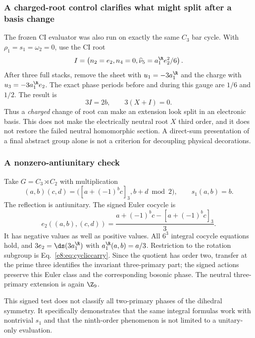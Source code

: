 \subsubsection{A charged-root control clarifies what might split after a basis change}
The frozen CI evaluator was also run on exactly the same $C_3$ bar cycle. With $\rho_1=s_1=\omega_2=0$, use the CI root
\begin{equation}
 I=\left(n_2=e_2,n_4=0,
              \widehat\nu_5=a_1^{\R}e_2^2/6\right).
 \label{e8:eq:CIcontrol}
\end{equation}
After three full stacks, remove the sheet with $u_1=-3a_1^{\R}$ and the charge with $u_3=-3a_1^{\R}e_2$. The exact phase periods before and during this gauge are $1/6$ and $1/2$. The result is
\begin{equation}
 3I=2b,\qquad 3(X+I)=0.
 \label{e8:eq:chargedbasis}
\end{equation}
Thus a \emph{charged} change of root can make an extension look split in an electronic basis. This does not make the electrically neutral root $X$ third order, and it does not restore the failed neutral homomorphic section. A direct-sum presentation of a final abstract group alone is not a criterion for decoupling physical decorations.

\subsubsection{A nonzero-antiunitary check}
Take $G=C_3\rtimes C_2$ with multiplication
\begin{equation}
(a,b)(c,d)=\big([a+(-1)^b c]_3,b+d\bmod2\big),\qquad s_1(a,b)=b.
\label{e8:eq:dihedral}
\end{equation}
The reflection is antiunitary. The signed Euler cocycle is
\begin{equation}
 e_2((a,b),(c,d))=
 \frac{a+(-1)^b c-[a+(-1)^bc]_3}{3}.
 \label{e8:eq:dihedralcarry}
\end{equation}
It has negative values as well as positive values. All $6^3$ integral cocycle equations hold, and $3e_2=\ds(3a_1^{\R})$ with $a_1^{\R}(a,b)=a/3$. Restriction to the rotation subgroup is Eq.~\eqref{e8:eq:cycliccarry}. Since the quotient has order two, transfer at the prime three identifies the invariant three-primary part; the signed actions preserve this Euler class and the corresponding bosonic phase. The neutral three-primary extension is again $\Z_9$.

This signed test does not classify all two-primary phases of the dihedral symmetry. It specifically demonstrates that the same integral formulas work with nontrivial $s_1$ and that the ninth-order phenomenon is not limited to a unitary-only evaluation.



